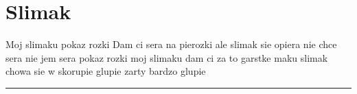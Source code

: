 \documentclass[letterpaper,10pt,polish]{sphinxmanual}
\begin{document}
\section{Slimak}
\label{\detokenize{Wiersz3:slimak}}
\sphinxAtStartPar
Moj slimaku pokaz rozki
Dam ci sera na pierozki
ale slimak sie opiera
nie chce sera nie jem sera
pokaz rozki moj slimaku
dam ci za to garstke maku
slimak chowa sie w skorupie
glupie zarty bardzo glupie


\bigskip\hrule\bigskip




\renewcommand{\indexname}{Indeks}
\printindex
\end{document}
